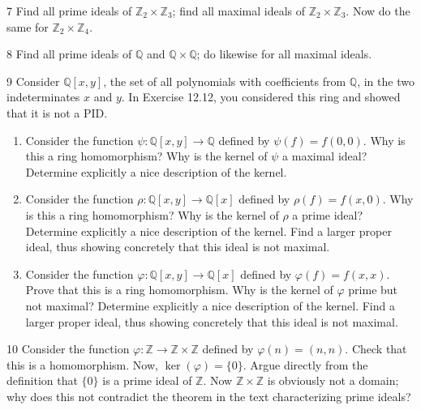 \begin{problem}{7}
    Find all prime ideals of $\mathbb{Z}_2 \times \mathbb{Z}_3$; find all maximal ideals of
    $\mathbb{Z}_2 \times \mathbb{Z}_3$. Now do the same for $\mathbb{Z}_2 \times \mathbb{Z}_4$.
\end{problem}
\unsolved

\begin{problem}{8}
    Find all prime ideals of $\mathbb{Q}$ and $\mathbb{Q} \times \mathbb{Q}$; do likewise for all maximal ideals.
\end{problem}
\unsolved

\newpage

\begin{problem}{9}
    Consider $\mathbb{Q}[x, y]$, the set of all polynomials with coefficients from
    $\mathbb{Q}$, in the two indeterminates $x$ and $y$. In Exercise 12.12, you considered
    this ring and showed that it is not a PID.
    \begin{enumerate}
        \item[(a)] Consider the function $\psi : \mathbb{Q}[x, y] \to \mathbb{Q}$ defined by
        $\psi(f) = f(0, 0)$. Why is this a ring homomorphism? Why is the kernel of $\psi$
        a maximal ideal? Determine explicitly a nice description of the kernel.
        \item[(b)] Consider the function $\rho : \mathbb{Q}[x, y] \to \mathbb{Q}[x]$ defined
        by $\rho(f) = f(x, 0)$. Why is this a ring homomorphism? Why is the kernel of
        $\rho$ a prime ideal? Determine explicitly a nice description of the kernel. Find a
        larger proper ideal, thus showing concretely that this ideal is not maximal.
        \item[(c)] Consider the function $\varphi : \mathbb{Q}[x, y] \to \mathbb{Q}[x]$
        defined by $\varphi(f) = f(x, x)$. Prove that this is a ring homomorphism. Why is
        the kernel of $\varphi$ prime but not maximal? Determine explicitly a nice
        description of the kernel. Find a larger proper ideal, thus showing concretely
        that this ideal is not maximal.
    \end{enumerate}
\end{problem}
\unsolved

\begin{problem}{10}
    Consider the function $\varphi : \mathbb{Z} \to \mathbb{Z} \times \mathbb{Z}$ defined
    by $\varphi(n) = (n, n)$. Check that this is a homomorphism. Now,
    $\ker(\varphi) = \{0\}$. Argue directly from the definition that $\{0\}$ is a prime
    ideal of $\mathbb{Z}$. Now $\mathbb{Z} \times \mathbb{Z}$ is obviously not a domain;
    why does this not contradict the theorem in the text characterizing prime ideals?
\end{problem}
\unsolved


